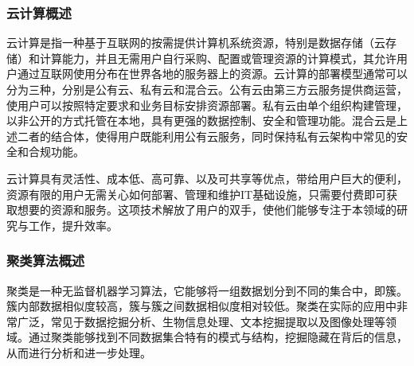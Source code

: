 \subsubsection{云计算概述}
云计算是指一种基于互联网的按需提供计算机系统资源，特别是数据存储（云存储）和计算能力，并且无需用户自行采购、配置或管理资源的计算模式\cite{montazerolghaem2020green}，其允许用户通过互联网使用分布在世界各地的服务器上的资源。云计算的部署模型通常可以分为三种，分别是公有云、私有云和混合云。公有云由第三方云服务提供商运营，使用户可以按照特定要求和业务目标安排资源部署。私有云由单个组织构建管理，以非公开的方式托管在本地，具有更强的数据控制、安全和管理功能。混合云是上述二者的结合体，使得用户既能利用公有云服务，同时保持私有云架构中常见的安全和合规功能。

云计算具有灵活性、成本低、高可靠、以及可共享等优点，带给用户巨大的便利，资源有限的用户无需关心如何部署、管理和维护IT基础设施，只需要付费即可获取想要的资源和服务。这项技术解放了用户的双手，使他们能够专注于本领域的研究与工作，提升效率。

\subsubsection{聚类算法概述}
聚类是一种无监督机器学习算法，它能够将一组数据划分到不同的集合中，即簇。簇内部数据相似度较高，簇与簇之间数据相似度相对较低。聚类在实际的应用中非常广泛，常见于数据挖掘分析、生物信息处理、文本挖掘提取以及图像处理等领域。通过聚类能够找到不同数据集合特有的模式与结构，挖掘隐藏在背后的信息，从而进行分析和进一步处理。

